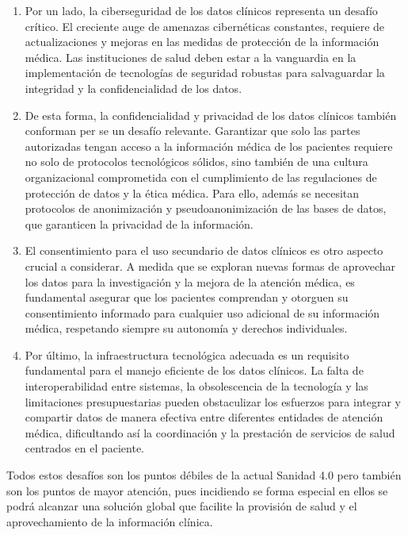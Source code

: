 \begin{enumerate}[label=\roman*.]
    \item Por un lado, la ciberseguridad de los datos clínicos representa un desafío crítico. El creciente auge de amenazas cibernéticas constantes, requiere de actualizaciones y mejoras en las medidas de protección de la información médica. Las instituciones de salud deben estar a la vanguardia en la implementación de tecnologías de seguridad robustas para salvaguardar la integridad y la confidencialidad de los datos.
    \item De esta forma, la confidencialidad y privacidad de los datos clínicos también conforman per se un desafío relevante. Garantizar que solo las partes autorizadas tengan acceso a la información médica de los pacientes requiere no solo de protocolos tecnológicos sólidos, sino también de una cultura organizacional comprometida con el cumplimiento de las regulaciones de protección de datos y la ética médica. Para ello, además se necesitan protocolos de anonimización y pseudoanonimización de las bases de datos, que garanticen la privacidad de la información.
    \item El consentimiento para el uso secundario de datos clínicos es otro aspecto crucial a considerar. A medida que se exploran nuevas formas de aprovechar los datos para la investigación y la mejora de la atención médica, es fundamental asegurar que los pacientes comprendan y otorguen su consentimiento informado para cualquier uso adicional de su información médica, respetando siempre su autonomía y derechos individuales.
    \item Por último, la infraestructura tecnológica adecuada es un requisito fundamental para el manejo eficiente de los datos clínicos. La falta de interoperabilidad entre sistemas, la obsolescencia de la tecnología y las limitaciones presupuestarias pueden obstaculizar los esfuerzos para integrar y compartir datos de manera efectiva entre diferentes entidades de atención médica, dificultando así la coordinación y la prestación de servicios de salud centrados en el paciente.
    
\end{enumerate}

Todos estos desafíos son los puntos débiles de la actual Sanidad 4.0 pero también son los puntos de mayor atención, pues incidiendo se forma especial en ellos se podrá alcanzar una solución global que facilite la provisión de salud y el aprovechamiento de la información clínica.

